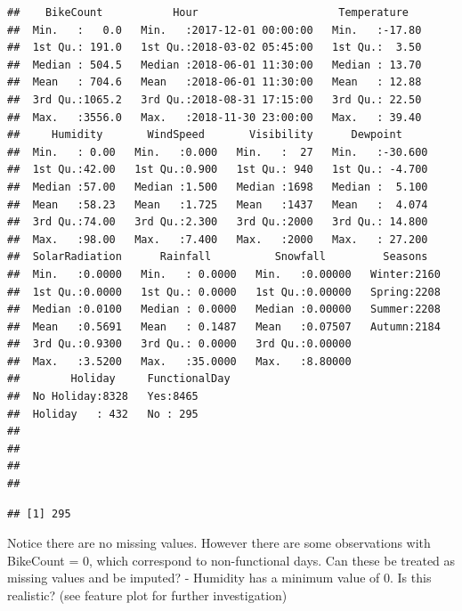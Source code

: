 \documentclass[
]{article}
\newenvironment{Shaded}{\begin{snugshade}}{\end{snugshade}}
\newcommand{\CommentTok}[1]{\textcolor[rgb]{0.56,0.35,0.01}{\textit{#1}}}
\newcommand{\DecValTok}[1]{\textcolor[rgb]{0.00,0.00,0.81}{#1}}
\newcommand{\FunctionTok}[1]{\textcolor[rgb]{0.00,0.00,0.00}{#1}}
\newcommand{\NormalTok}[1]{#1}
\newcommand{\SpecialCharTok}[1]{\textcolor[rgb]{0.00,0.00,0.00}{#1}}
\begin{document}
\begin{verbatim}
##    BikeCount           Hour                      Temperature    
##  Min.   :   0.0   Min.   :2017-12-01 00:00:00   Min.   :-17.80  
##  1st Qu.: 191.0   1st Qu.:2018-03-02 05:45:00   1st Qu.:  3.50  
##  Median : 504.5   Median :2018-06-01 11:30:00   Median : 13.70  
##  Mean   : 704.6   Mean   :2018-06-01 11:30:00   Mean   : 12.88  
##  3rd Qu.:1065.2   3rd Qu.:2018-08-31 17:15:00   3rd Qu.: 22.50  
##  Max.   :3556.0   Max.   :2018-11-30 23:00:00   Max.   : 39.40  
##     Humidity       WindSpeed       Visibility      Dewpoint      
##  Min.   : 0.00   Min.   :0.000   Min.   :  27   Min.   :-30.600  
##  1st Qu.:42.00   1st Qu.:0.900   1st Qu.: 940   1st Qu.: -4.700  
##  Median :57.00   Median :1.500   Median :1698   Median :  5.100  
##  Mean   :58.23   Mean   :1.725   Mean   :1437   Mean   :  4.074  
##  3rd Qu.:74.00   3rd Qu.:2.300   3rd Qu.:2000   3rd Qu.: 14.800  
##  Max.   :98.00   Max.   :7.400   Max.   :2000   Max.   : 27.200  
##  SolarRadiation      Rainfall          Snowfall         Seasons    
##  Min.   :0.0000   Min.   : 0.0000   Min.   :0.00000   Winter:2160  
##  1st Qu.:0.0000   1st Qu.: 0.0000   1st Qu.:0.00000   Spring:2208  
##  Median :0.0100   Median : 0.0000   Median :0.00000   Summer:2208  
##  Mean   :0.5691   Mean   : 0.1487   Mean   :0.07507   Autumn:2184  
##  3rd Qu.:0.9300   3rd Qu.: 0.0000   3rd Qu.:0.00000                
##  Max.   :3.5200   Max.   :35.0000   Max.   :8.80000                
##        Holiday     FunctionalDay
##  No Holiday:8328   Yes:8465     
##  Holiday   : 432   No : 295     
##                                 
##                                 
##                                 
## 
\end{verbatim}

\begin{Shaded}
\end{Shaded}

\begin{verbatim}
## [1] 295
\end{verbatim}

Notice there are no missing values. However there are some observations
with BikeCount = 0, which correspond to non-functional days. Can these
be treated as missing values and be imputed? - Humidity has a minimum
value of 0. Is this realistic? (see feature plot for further
investigation)
\end{document}
